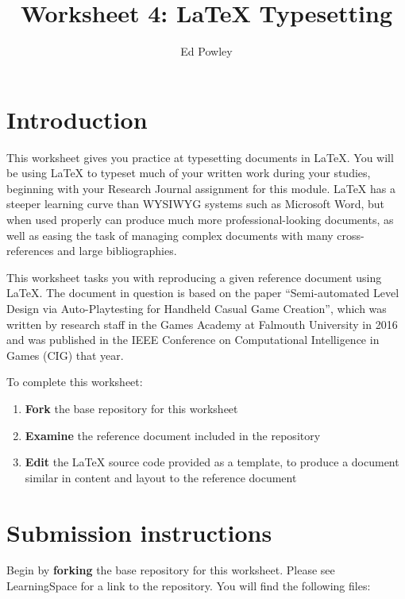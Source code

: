 \documentclass{../../../fal_assignment}
\title{Worksheet 4: LaTeX Typesetting}
\author{Ed Powley}
\begin{document}
\maketitle
{}

\section*{Introduction}

This worksheet gives you practice at typesetting documents in LaTeX.
You will be using LaTeX to typeset much of your written work during your studies, beginning with your Research Journal
assignment for this module.
LaTeX has a steeper learning curve than WYSIWYG systems such as Microsoft Word,
but when used properly can produce much more professional-looking documents,
as well as easing the task of managing complex documents with many cross-references and large bibliographies.

This worksheet tasks you with reproducing a given reference document using LaTeX.
The document in question is based on the paper ``Semi-automated Level Design via Auto-Playtesting for Handheld Casual 
Game Creation'', which was written by research staff in the Games Academy at Falmouth University in 2016
and was published in the IEEE Conference on Computational Intelligence in Games (CIG) that year.

To complete this worksheet:

\begin{enumerate}[label=(\alph*)]
	\item \textbf{Fork} the base repository for this worksheet
	\item \textbf{Examine} the reference document included in the repository
	\item \textbf{Edit} the LaTeX source code provided as a template, to produce a document similar in content and layout to the reference document
\end{enumerate}

\section*{Submission instructions}

Begin by \textbf{forking} the base repository for this worksheet.
Please see LearningSpace for a link to the repository.
You will find the following files:
\end{document}
